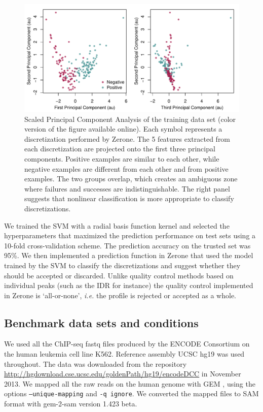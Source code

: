 \documentclass{bioinfo}
\begin{document}
\begin{methods}
\begin{figure}[!tpb]
\centerline{\includegraphics[scale=0.45]{PCA.pdf}}
\caption{
  Scaled Principal Component Analysis of the training data set
  (color version of the figure available online).
  Each symbol represents a discretization performed by Zerone. The
  5 features extracted from each discretization are projected onto
  the first three principal components. Positive examples
  are similar to each other, while negative examples
  are different from each other and from positive examples.
  The two groups overlap, which creates an ambiguous zone where
  failures and successes are indistinguishable. The right panel
  suggests that nonlinear classification is more appropriate to
  classify discretizations.
}\label{fig:pca}
\end{figure}

We trained the SVM with a radial basis function kernel and
selected the hyperparameters that maximized the prediction
performance on test sets using a 10-fold cross-validation scheme.
The prediction accuracy on the trusted set was 95\%.
We then implemented a prediction function in Zerone that used the
model trained by the SVM to classify the discretizations and
suggest whether they should be accepted or discarded. Unlike
quality control methods based on individual peaks (such as the
IDR for instance) the quality control implemented in Zerone is
`all-or-none', \textit{i.e.} the profile is rejected or accepted
as a whole.

\subsection{Benchmark data sets and conditions}
\label{sub:bench_cond}
We used all the ChIP-seq fastq files produced by the ENCODE Consortium
on the human leukemia cell line K562. Reference assembly UCSC hg19 was
used throughout. The data was downloaded from the repository
\href{http://hgdownload.cse.ucsc.edu/goldenPath/hg19/encodeDCC}{http://hgdownload.cse.ucsc.edu/goldenPath/hg19/encodeDCC} in November 2013.
We mapped all the raw reads on the human genome with
GEM \citep[gem-mapper version 1.376 beta, gem-indexer version
1.423 beta,][]{pmid23103880}, using the options \texttt{--unique-mapping} and
\texttt{-q ignore}. We converted the mapped files to SAM format with
gem-2-sam version 1.423 beta.


\end{methods}
\end{document}
